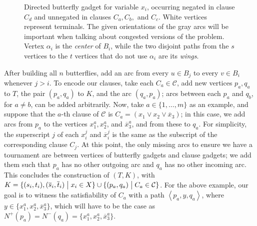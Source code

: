 \documentclass[a4paper,UKenglish,cleveref, autoref, thm-restate]{lipics-v2021}
\renewcommand{\mid}{\bigm|}
\newcommand{\angled}[1]{\left\langle{#1}\right\rangle}
\newcommand{\ol}[1]{\overline{#1}}
\begin{document}
\begin{figure}[!htb]
\begin{subfigure}[t]{0.33\textwidth}
    \end{subfigure}
    \caption{Directed butterfly gadget for variable $x_i$, occurring negated in clause $C_d$
      and unnegated in clauses $C_a, C_b,$ and $C_c$.
      White vertices represent terminals.
      The given orientations of the gray arcs will be 
      important when talking about congested versions of the problem. Vertex
      $\alpha_i$ is the \textit{center} of $B_i$, while the two disjoint paths from
      the $s$ vertices to the $t$ vertices that do not use $\alpha_i$ are its \textit{wings}.}
    \label{fig:directed_butterfly}
  \end{figure}

  After building all $n$ butterflies, add an arc from every $u \in B_j$ to every $v \in B_i$ whenever $j > i$.
  To encode our clauses, take each $C_a \in \mathcal{C}$, add new vertices $p_a, q_a$ to $T$,
  the pair $(p_a, q_a)$ to $K$, and the arc $(q_a, p_a)$; arcs between each $p_a$ and $q_b$,
  for $a \neq b$, can be added arbitrarily.
  Now, take $a \in \{1, \dots, m\}$ as an example, and suppose that the $a$-th clause of $\mathcal{C}$ is $C_a = (x_1 \vee x_2 \vee \ol{x}_3)$; in this case, we add
  arcs from $p_a$ to the vertices $x^a_1, x^a_2$, and $\ol{x}^a_3$, and from these to $q_a$.
  For simplicity, the superscript $j$ of
  each $x^j_i$ and $\ol{x}^j_i$ is the same as the subscript of the corresponding clause $C_j$.
  At this point, the only missing arcs to ensure we have a tournament are between vertices of butterfly gadgets and clause
  gadgets; we add them such that $p_a$ has no other outgoing arc and $q_a$ has no other
  incoming arc. This concludes the construction of $(T, K)$, with $K = \{(s_i, t_i), (\ol{s}_i, \ol{t}_i) \mid x_i \in X\} \cup \{(p_a, q_a) \mid C_a \in \mathcal{C}\}$. For the above example, our goal is to witness the satisfiability of $C_a$ with a path $\angled{p_a, y, q_a}$, where $y \in \{x^a_1, x^a_2, \ol{x}^a_3\}$, which will have to be the case as $N^+(p_a) = N^-(q_a) = \{x^a_1, x^a_2, \ol{x}^a_3\}$.
\end{document}
